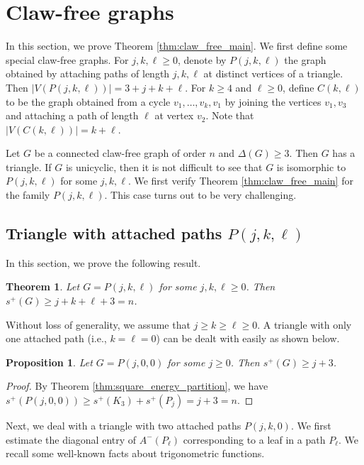 \documentclass{article}
\newtheorem{theorem}{Theorem}[section]
\newtheorem{proposition}{Proposition}[section]
\begin{document}
\section{Claw-free graphs}\label{section:claw-free}

In this section, we prove Theorem \ref{thm:claw_free_main}. We first define some special claw-free graphs. For $j,k,\ell \ge 0$, denote by $P(j,k,\ell)$ the graph obtained by attaching paths of length $j,k,\ell$ at distinct vertices of a triangle. Then $|V(P(j,k,\ell))|=3+j+k+\ell$. For $k\ge 4$ and $\ell\ge 0$, define $C(k,\ell)$ to be the graph obtained from a cycle $v_1, \ldots, v_k, v_1$ by joining the vertices $v_1, v_3$ and attaching a path of length $\ell$ at vertex $v_2$. Note that $|V(C(k,\ell))|=k+\ell$.

Let $G$ be a connected claw-free graph of order $n$ and $\Delta(G)\ge 3$. Then $G$ has a triangle. If $G$ is unicyclic, then it is not difficult to see that $G$ is isomorphic to $P(j,k,\ell)$ for some $j,k,\ell$. We first verify Theorem \ref{thm:claw_free_main} for the family $P(j,k,\ell)$. This case turns out to be very challenging.

\subsection{Triangle with attached paths $P(j,k,\ell)$}

In this section, we prove the following result.

\begin{theorem}\label{thm:triangle_with_paths}
Let $G=P(j,k,\ell)$ for some $j,k,\ell \ge 0$. Then $s^+(G)\ge j + k + \ell + 3 = n$.
\end{theorem}

Without loss of generality, we assume that $j\ge k\ge \ell\ge 0$. A triangle with only one attached path (i.e., $k=\ell =0$) can be dealt with easily as shown below.

\begin{proposition}\label{prop:triangle_one_path}
   Let $G=P(j,0,0)$ for some $j\ge 0$. Then $s^+(G)\ge j+3$.
\end{proposition}

\begin{proof}
By Theorem \ref{thm:square_energy_partition}, we have $s^+(P(j,0,0))\ge s^+(K_3) + s^+(P_j) = j +3 = n$. 
\end{proof}

Next, we deal with a triangle with two attached paths $P(j,k,0)$. We first estimate the diagonal entry of $A^-(P_\ell)$ corresponding to a leaf in a path $P_{\ell}$. We recall some well-known facts about trigonometric functions.
\end{document}

